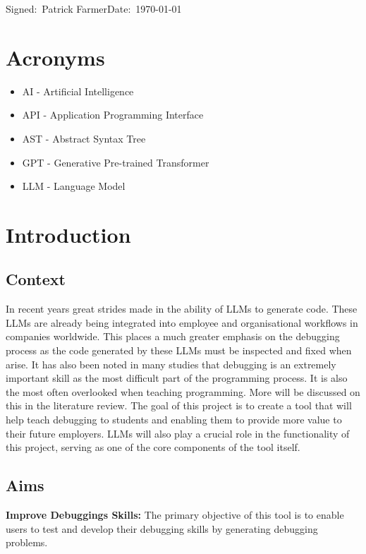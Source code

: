 \documentclass[12pt]{extarticle}
\begin{document}
\small Signed:~Patrick Farmer\hfill Date:~\today

\newpage
\tableofcontents

\newpage
\section*{Acronyms}

\begin{itemize}
    \item AI - Artificial Intelligence
    \item API - Application Programming Interface
    \item AST - Abstract Syntax Tree
    \item GPT - Generative Pre-trained Transformer
    \item LLM - Language Model
\end{itemize}
\newpage
\section{Introduction}

\subsection{Context}

In recent years great strides made in the ability of LLMs to generate code. These LLMs are already being integrated into employee and organisational workflows in companies worldwide. This places a much greater emphasis on the debugging process as the code generated by these LLMs must be inspected and fixed when arise. It has also been noted in many studies that debugging is an extremely important skill as the most difficult part of the programming process. It is also the most often overlooked when teaching programming. More will be discussed on this in the literature review. The goal of this project is to create a tool that will help teach debugging to students and enabling them to provide more value to their future employers. LLMs will also play a crucial role in the functionality of this project, serving as one of the core components of the tool itself.

\subsection{Aims}

\textbf{Improve Debuggings Skills:} The primary objective of this tool is to enable users to test and develop their debugging skills by generating debugging problems.
\end{document}
